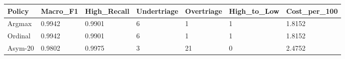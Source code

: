 \begin{tabular}{lllllll}
\toprule
Policy & Macro\_F1 & High\_Recall & Undertriage & Overtriage & High\_to\_Low & Cost\_per\_100 \\
\midrule
Argmax & 0.9942 & 0.9901 & 6 & 1 & 1 & 1.8152 \\
Ordinal & 0.9942 & 0.9901 & 6 & 1 & 1 & 1.8152 \\
Asym-20 & 0.9802 & 0.9975 & 3 & 21 & 0 & 2.4752 \\
\bottomrule
\end{tabular}
